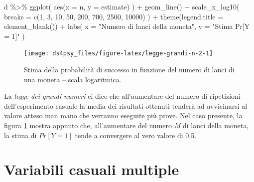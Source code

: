 \documentclass[
  11pt,
]{krantz}
\makeatletter
\newenvironment{Shaded}{\begin{snugshade}}{\end{snugshade}}
\newcommand{\AttributeTok}[1]{\textcolor[rgb]{0.61,0.61,0.61}{#1}}
\newcommand{\DecValTok}[1]{\textcolor[rgb]{0.06,0.06,0.06}{#1}}
\newcommand{\FunctionTok}[1]{\textcolor[rgb]{0,0,0}{#1}}
\newcommand{\NormalTok}[1]{#1}
\newcommand{\SpecialCharTok}[1]{\textcolor[rgb]{0,0,0}{#1}}
\newcommand{\StringTok}[1]{\textcolor[rgb]{0.5,0.5,0.5}{#1}}
\newenvironment{kframe}{%
\medskip{}
\setlength{\fboxsep}{.8em}
 \def\at@end@of@kframe{}%
 \ifinner\ifhmode%
  \def\at@end@of@kframe{\end{minipage}}%
  \begin{minipage}{\columnwidth}%
 \fi\fi%
 \def\FrameCommand##1{\hskip\@totalleftmargin \hskip-\fboxsep
 \colorbox{shadecolor}{##1}\hskip-\fboxsep
     \hskip-\linewidth \hskip-\@totalleftmargin \hskip\columnwidth}%
 \MakeFramed {\advance\hsize-\width
   \@totalleftmargin\z@ \linewidth\hsize
   \@setminipage}}%
 {\par\unskip\endMakeFramed%
 \at@end@of@kframe}
\renewenvironment{Shaded}{\begin{kframe}}{\end{kframe}}
\theoremstyle{definition}
\theoremstyle{definition}
\theoremstyle{definition}
\theoremstyle{definition}
\theoremstyle{remark}
\makeatother
\begin{document}
\begin{Shaded}
\begin{Highlighting}[]
\NormalTok{d }\SpecialCharTok{\%\textgreater{}\%} 
  \FunctionTok{ggplot}\NormalTok{(}
    \FunctionTok{aes}\NormalTok{(}\AttributeTok{x =}\NormalTok{ n, }\AttributeTok{y =}\NormalTok{ estimate)}
\NormalTok{  ) }\SpecialCharTok{+}
  \FunctionTok{geom\_line}\NormalTok{() }\SpecialCharTok{+}
  \FunctionTok{scale\_x\_log10}\NormalTok{(}
    \AttributeTok{breaks =} \FunctionTok{c}\NormalTok{(}\DecValTok{1}\NormalTok{, }\DecValTok{3}\NormalTok{, }\DecValTok{10}\NormalTok{, }\DecValTok{50}\NormalTok{, }\DecValTok{200}\NormalTok{, }
               \DecValTok{700}\NormalTok{, }\DecValTok{2500}\NormalTok{, }\DecValTok{10000}\NormalTok{)}
\NormalTok{  ) }\SpecialCharTok{+}
  \FunctionTok{theme}\NormalTok{(}\AttributeTok{legend.title =} \FunctionTok{element\_blank}\NormalTok{()) }\SpecialCharTok{+}
  \FunctionTok{labs}\NormalTok{(}
    \AttributeTok{x =} \StringTok{"Numero di lanci della moneta"}\NormalTok{, }
    \AttributeTok{y =} \StringTok{"Stima Pr[Y = 1]"}
\NormalTok{)}
\end{Highlighting}
\end{Shaded}

\begin{figure}[h]

{\centering \texttt{[image: ds4psy\_files/figure-latex/legge-grandi-n-2-1]} 

}

\caption{Stima della probabilità di successo in funzione del numero di lanci di una moneta -- scala logaritmica.}\label{fig:legge-grandi-n-2}
\end{figure}

La \emph{legge dei grandi numeri} ci dice che all'aumentare del numero di ripetizioni dell'esperimento casuale la media dei risultati ottenuti tenderà ad avvicinarsi al valore atteso man mano che verranno eseguite più prove. Nel caso presente, la figura \ref{fig:legge-grandi-n-2} mostra appunto che, all'aumentare del numero \emph{M} di lanci della moneta, la stima di \(Pr[Y = 1]\) tende a convergere al vero valore di 0.5.

\hypertarget{variabili-casuali-multiple}{%
\section{Variabili casuali multiple}\label{variabili-casuali-multiple}}
\end{document}
